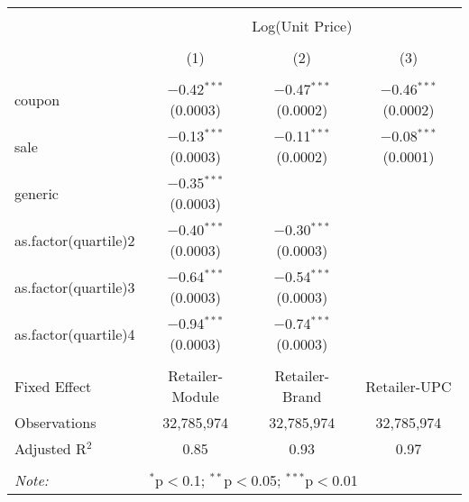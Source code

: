 
\begin{table}[!htbp] \centering 
  \caption{} 
  \label{tab:overallSavingsStorable} 
\begin{tabular}{@{\extracolsep{5pt}}lccc} 
\\[-1.8ex]\hline 
\hline \\[-1.8ex] 
 & \multicolumn{3}{c}{Log(Unit Price)} \\ 
\\[-1.8ex] & (1) & (2) & (3)\\ 
\hline \\[-1.8ex] 
 coupon & $-$0.42$^{***}$ (0.0003) & $-$0.47$^{***}$ (0.0002) & $-$0.46$^{***}$ (0.0002) \\ 
  sale & $-$0.13$^{***}$ (0.0003) & $-$0.11$^{***}$ (0.0002) & $-$0.08$^{***}$ (0.0001) \\ 
  generic & $-$0.35$^{***}$ (0.0003) &  &  \\ 
  as.factor(quartile)2 & $-$0.40$^{***}$ (0.0003) & $-$0.30$^{***}$ (0.0003) &  \\ 
  as.factor(quartile)3 & $-$0.64$^{***}$ (0.0003) & $-$0.54$^{***}$ (0.0003) &  \\ 
  as.factor(quartile)4 & $-$0.94$^{***}$ (0.0003) & $-$0.74$^{***}$ (0.0003) &  \\ 
 \hline \\[-1.8ex] 
Fixed Effect & Retailer-Module & Retailer-Brand & Retailer-UPC \\ 
Observations & 32,785,974 & 32,785,974 & 32,785,974 \\ 
Adjusted R$^{2}$ & 0.85 & 0.93 & 0.97 \\ 
\hline 
\hline \\[-1.8ex] 
\textit{Note:}  & \multicolumn{3}{l}{$^{*}$p$<$0.1; $^{**}$p$<$0.05; $^{***}$p$<$0.01} \\ 
\end{tabular} 
\end{table} 
